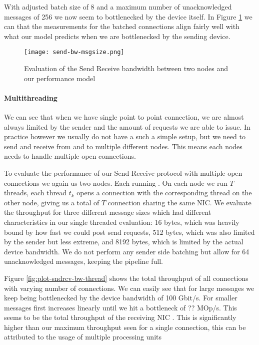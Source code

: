 With adjusted batch size of 8 and a maximum number of unacknowledged messages of 256 we now seem to bottlenecked by the 
device itself. In Figure \ref{fig:plot-sndrcv-bw} we can that the measurements for the batched connections align fairly 
well with what our model predicts when we are bottlenecked by the sending device. 

\begin{figure}[h]
\texttt{[image: send-bw-msgsize.png]}
\caption{Evaluation of the Send Receive bandwidth between two nodes and our performance model}
\label{fig:plot-sndrcv-bw}
\end{figure}


\paragraph{Multithreading}

We can see that when we have single point to point connection, we are almost always limited by the sender and the 
amount of requests we are able to issue. In practice however we usually do not have a such a simple setup, but we
need to send and receive from and to multiple different nodes. This means each nodes needs to handle multiple open
connections.

To evaluate the performance of our Send Receive protocol with multiple open connections we again us two nodes. Each 
running . On each node we run $T$ threads, each thread $t_k$ opens a connection with the corresponding 
thread on the other node, giving us a total of $T$ connection sharing the same NIC. We evaluate the throughput for 
three different message sizes which had different characteristics in our single threaded evaluation: 16 bytes, 
which was heavily bound by how fast we could post send requests, 512 bytes, which was also limited by the sender
but less extreme, and 8192 bytes, which is limited by the actual device bandwidth. We do not perform any sender side
batching but allow for 64 unacknowledged messages, keeping the pipeline full.


Figure \ref{fig:plot-sndrcv-bw-thread} shows the total throughput of all connections with varying number of connections.
We can easily see that for large messages we keep being bottlenecked by the device bandwidth of 100 Gbit/s. For smaller
messages first increases linearly until we hit a bottleneck of ?? MOp/s. This seems to be the total throughput of the 
receiving NIC . This is significantly higher than our maximum throughput seen for a single connection,
this can be attributed to the usage of multiple processing units~\cite{}


